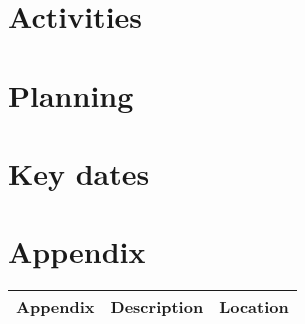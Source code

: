 \chapter{Activities}\label{chap:activities}

\chapter{Planning}\label{chap:planning}

\chapter{Key dates}\label{chap:keyDates}

\chapter{Appendix}\label{chap:appendix}

\begin{tabular}{|m{}|m{}|m{}|} 
    \hline
    \textbf{Appendix} & \textbf{Description} & \textbf{Location} \\ [0.5ex] \hline
    \hline
\end{tabular}

